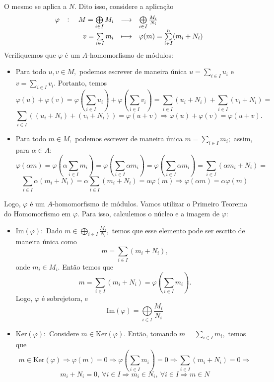 \documentclass[11pt,a4paper]{article}
\begin{document}
{O mesmo se aplica a $N.$ Dito isso, considere a aplicação
\[
\fullfunction{\varphi}{M = \bigoplus\limits_{i\in I} M_i}{\bigoplus\limits_{i \in I}  \frac{M_i}{N_i}}{v = \sum\limits_{i\in I} m_i}{\varphi(m) = \sum\limits_{i \in I}^n (m_i + N_i)}
\]
Verifiquemos que $\varphi$ é um $A$-homomorfismo de módulos:
\begin{itemize}
    \item Para todo $u, v \in M,$ podemos escrever de maneira única $u = \sum\limits_{i \in I} u_i$ e $v = \sum\limits_{i \in I} v_i$. Portanto, temos
    \[\varphi(u) + \varphi(v) = \varphi\left(\sum\limits_{i\in I} u_i \right) + \varphi\left(\sum\limits_{i\in I} v_i \right) = \sum\limits_{i\in I} (u_i + N_i) +  \sum\limits_{i \in I} (v_i + N_i) =  \]\[\sum\limits_{i \in I} ((u_i + N_i) + (v_i + N_i)) = \varphi(u + v) \Rightarrow \varphi(u) + \varphi(v) = \varphi(u+v).\]
    \item Para todo $m \in M,$ podemos escrever de maneira única $m = \sum\limits_{i \in I} m_i;$ assim, para $\alpha \in A:$
    \[
    \varphi(\alpha m) = \varphi\left(\alpha \sum\limits_{i\in I} m_i \right) =   \varphi\left( \sum\limits_{i \in I} \alpha m_i \right) = \varphi\left( \sum\limits_{i \in I} \alpha m_i \right) = \sum\limits_{i \in I} (\alpha m_i + N_i) = \]\[ \sum\limits_{i \in I} \alpha (m_i + N_i)  = \alpha \sum\limits_{i \in I} (m_i + N_i) = \alpha \varphi(m) \Rightarrow \varphi(\alpha m) = \alpha \varphi(m) 
    \]
\end{itemize}
Logo, $\varphi$ é um  $A$-homomorfismo de módulos. Vamos utilizar o Primeiro Teorema do Homomorfismo em $\varphi.$ Para isso, calculemos o núcleo e a imagem de $\varphi:$
\begin{itemize}
    \item $\mbox{Im} (\varphi):$ Dado $m \in \bigoplus\limits_{i\in I}  \frac{M_i}{N_i},$ temos que esse elemento pode ser escrito de maneira única como 
    \[
    m = \sum\limits_{i \in I} (m_i + N_i),
    \]
    onde $m_i \in M_i.$ Então temos que
        \[
     m = \sum\limits_{i \in I} (m_i + N_i) = \varphi\left(  \sum\limits_{i \in I} m_i \right).
    \]
    Logo, $\varphi$ é sobrejetora, e 
    \[
    \mbox{Im}(\varphi) = \bigoplus\limits_{i \in I}  \frac{M_i}{N_i}
    \]
    \item $\mbox{Ker} (\varphi):$ Considere $m \in \mbox{Ker}(\varphi).$ Então, tomando $m = \sum\limits_{i \in I} m_i,$ temos que
    \[
 m \in \mbox{Ker}(\varphi) \Rightarrow \varphi(m) = 0 \Rightarrow \varphi\left(\sum\limits_{i \in I} m_i \right) = 0 \Rightarrow \sum\limits_{i \in I} (m_i + N_i) = 0 \Rightarrow \]\[m_i + N_i = 0, \ \forall i \in  I \Rightarrow m_i \in N_i , \ \forall i \in  I \Rightarrow m \in N
\]
\end{itemize}}
\end{document}
